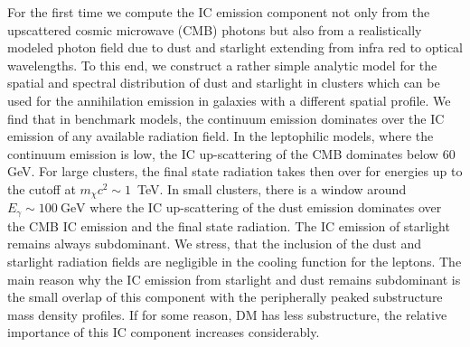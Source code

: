\documentclass[10pt,aps,pra,reprint,amsmath,amsfonts,amssymb,showpacs,nofootinbib,floatfix]{revtex4-1}
\begin{document}
For the first time we compute the IC emission component not only from
the upscattered cosmic microwave (CMB) photons but also from a
realistically modeled photon field due to dust and starlight extending
from infra red to optical wavelengths. To this end, we construct a
rather simple analytic model for the spatial and spectral
distribution of dust and starlight in clusters which can be used for
the annihilation emission in galaxies with a different spatial
profile.  We find that in benchmark models, the continuum emission
dominates over the IC emission of any available radiation field. In
the leptophilic models, where the continuum emission is low, the IC
up-scattering of the CMB dominates below 60 GeV. For large clusters,
the final state radiation takes then over for energies up to the
cutoff at $m_\chi c^2 \sim 1$~TeV. In small clusters, there is a
window around $E_\gamma \sim 100~\mathrm{GeV}$ where the IC
up-scattering of the dust emission dominates over the CMB IC emission
and the final state radiation. The IC emission of starlight remains
always subdominant.  We stress, that the inclusion of the dust and
starlight radiation fields are negligible in the cooling function for
the leptons.  The main reason why the IC emission from starlight and
dust remains subdominant is the small overlap of this component with
the peripherally peaked substructure mass density profiles. If for
some reason, DM has less substructure, the relative importance of this
IC component increases considerably.
\end{document}
